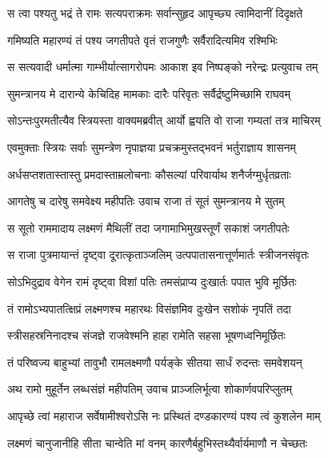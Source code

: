 \twolineshloka
{स त्वा पश्यतु भद्रं ते रामः सत्यपराक्रमः}
{सर्वान्सुहृद आपृच्छ्य त्वामिदानीं दिदृक्षते} %

\twolineshloka
{गमिष्यति महारण्यं तं पश्य जगतीपते}
{वृतं राजगुणैः सर्वैरादित्यमिव रश्मिभिः} %

\twolineshloka
{स सत्यवादी धर्मात्मा गाम्भीर्यात्सागरोपमः}
{आकाश इव निष्पङ्को नरेन्द्रः प्रत्युवाच तम्} %

\twolineshloka
{सुमन्त्रानय मे दारान्ये केचिदिह मामकाः}
{दारैः परिवृतः सर्वैर्द्रष्टुमिच्छामि राघवम्} %

\twolineshloka
{सोऽन्तःपुरमतीत्यैव स्त्रियस्ता वाक्यमब्रवीत्}
{आर्यो ह्वयति वो राजा गम्यतां तत्र माचिरम्} %

\twolineshloka
{एवमुक्ताः स्त्रियः सर्वाः सुमन्त्रेण नृपाज्ञया}
{प्रचक्रमुस्तद्भवनं भर्तुराज्ञाय शासनम्} %

\twolineshloka
{अर्धसप्तशतास्तास्तु प्रमदास्ताम्रलोचनाः}
{कौसल्यां परिवार्याथ शनैर्जग्मुर्धृतव्रताः} %

\twolineshloka
{आगतेषु च दारेषु समवेक्ष्य महीपतिः}
{उवाच राजा तं सूतं सुमन्त्रानय मे सुतम्} %

\twolineshloka
{स सूतो राममादाय लक्ष्मणं मैथिलीं तदा}
{जगामाभिमुखस्तूर्णं सकाशं जगतीपतेः} %

\twolineshloka
{स राजा पुत्रमायान्तं दृष्ट्वा दूरात्कृताञ्जलिम्}
{उत्पपातासनात्तूर्णमार्तः स्त्रीजनसंवृतः} %

\twolineshloka
{सोऽभिदुद्राव वेगेन रामं दृष्ट्वा विशां पतिः}
{तमसंप्राप्य दुःखार्तः पपात भुवि मूर्छितः} %

\twolineshloka
{तं रामोऽभ्यपातत्क्षिप्रं लक्ष्मणश्च महारथः}
{विसंज्ञमिव दुःखेन सशोकं नृपतिं तदा} %

\twolineshloka
{स्त्रीसहस्रनिनादश्च संजज्ञे राजवेश्मनि}
{हाहा रामेति सहसा भूषणध्वनिमूर्छितः} %

\twolineshloka
{तं परिष्वज्य बाहुभ्यां तावुभौ रामलक्ष्मणौ}
{पर्यङ्के सीतया सार्धं रुदन्तः समवेशयन्} %

\twolineshloka
{अथ रामो मुहूर्तेन लब्धसंज्ञं महीपतिम्}
{उवाच प्राञ्जलिर्भूत्वा शोकार्णवपरिप्लुतम्} %

\twolineshloka
{आपृच्छे त्वां महाराज सर्वेषामीश्वरोऽसि नः}
{प्रस्थितं दण्डकारण्यं पश्य त्वं कुशलेन माम्} %

\twolineshloka
{लक्ष्मणं चानुजानीहि सीता चान्वेति मां वनम्}
{कारणैर्बहुभिस्तथ्यैर्वार्यमाणौ न चेच्छतः} %

